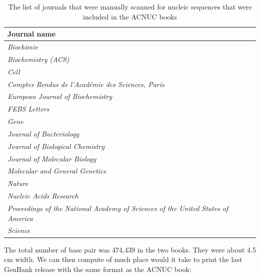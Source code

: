 \documentclass{article}
\begin{document}
\begin{table}[ht]
\begin{scriptsize}
\begin{center}
\begin{tabular}{l}
\hline
\hline
Journal name\\
\hline
\textit{Biochimie}\\
\textit{Biochemistry (ACS)}\\
\textit{Cell}\\
\textit{Comptes Rendus de l'Acad{\'e}mie des Sciences, Paris}\\
\textit{European Journal of Biochemistry}\\
\textit{FEBS Letters}\\
\textit{Gene}\\
\textit{Journal of Bacteriology}\\
\textit{Journal of Biological Chemistry}\\
\textit{Journal of Molecular Biology}\\
\textit{Molecular and General Genetics}\\
\textit{Nature}\\
\textit{Nucleic Acids Research}\\
\textit{Proceedings of the National Academy of Sciences of the United States of America}\\
\textit{Science}\\
\hline
\hline
\end{tabular}
\caption{The list of journals that were manually scanned for nucleic sequences that
were included in the ACNUC books \cite{GautierC1982a, GautierC1982b}}
\label{JournalACNUC}
\end{center}
\end{scriptsize}
\end{table}


The total number of base pair was 474,439 in the two books. They were about 4.5 cm
width. We can then compute of much place would it take to print the last GenBank
release with the same format as the ACNUC book: 
\end{document}
